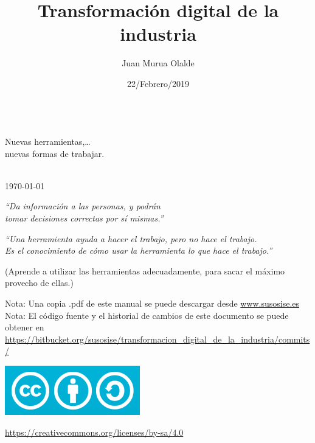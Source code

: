 \documentclass[spanish,12pt,a4paper,final,oneside]{book}
\title{Transformación digital de la industria}
\author{Juan Murua Olalde}
\date{22/Febrero/2019}
\begin{document}
\begin{titlepage}

\begin{flushright}
\vspace{2cm}
\begin{Huge}\MyTitle\end{Huge}
\\
\vspace{0.3cm}
{\large Nuevas herramientas,\ldots\\nuevas formas de trabajar.}
\\
\vspace{1cm}
\MyAuthor

\vspace{1cm}
\MyDate
\\ \today
\\\end{flushright}

\begin{flushleft}
\vspace{4cm}

\textit{``Da información a las personas, y podrán \\tomar decisiones correctas por sí mismas.''}

\vspace{2cm}
\textit{``Una herramienta ayuda a hacer el trabajo, pero no hace el trabajo.\\ Es el conocimiento de cómo usar la herramienta lo que hace el trabajo.''}

\begin{footnotesize}(Aprende a utilizar las herramientas adecuadamente, para sacar el máximo provecho de ellas.)\end{footnotesize}

\end{flushleft}

\vfill
\begin{small}
Nota: Una copia .pdf de este manual se puede descargar desde \url{www.susosise.es}
\\Nota: El código fuente y el historial de cambios de este documento se puede obtener en \\ \url{https://bitbucket.org/susosise/transformacion_digital_de_la_industria/commits/}

\end{small}\begin{flushleft}
\includegraphics[scale=0.3]{CreativeCommons-Attribution-ShareAlike-logo}
\begin{small}\url{https://creativecommons.org/licenses/by-sa/4.0}\end{small}
\end{flushleft}

\end{titlepage}
\end{document}
